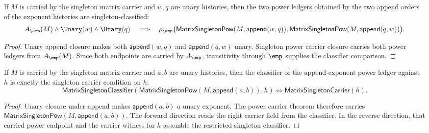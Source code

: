 \begin{theorem}
\label{thm:matrix-singleton-pow-append-exponent-comm-classifier}
If $M$ is carried by the singleton matrix carrier and $w,q$ are unary
histories, then the two power ledgers obtained by the two append orders of the
exponent histories are singleton-classified:
$$
A_{\emp}(M)\land\Unary(w)\land\Unary(q)
\quad\Longrightarrow\quad
\rho_{\emp}\bigl(\mathsf{MatrixSingletonPow}(M,\mathsf{append}(w,q)),
\mathsf{MatrixSingletonPow}(M,\mathsf{append}(q,w))\bigr).
$$
\end{theorem}
\begin{proof}
Unary append closure makes both $\mathsf{append}(w,q)$ and
$\mathsf{append}(q,w)$ unary. Singleton power carrier closure carries both
power ledgers from $A_{\emp}(M)$. Since both endpoints are carried by
$A_{\emp}$, transitivity through $\emp$ supplies the classifier comparison.
\end{proof}

\begin{theorem}
\label{thm:matrix-singleton-pow-append-exponent-classifier-iff}
If $M$ is carried by the singleton matrix carrier and $a,b$ are unary
histories, then the classifier of the append-exponent power ledger against
$h$ is exactly the singleton carrier condition on $h$:
$$
\mathsf{MatrixSingletonClassifier}
  (\mathsf{MatrixSingletonPow}(M,\mathsf{append}(a,b)),h)
\Longleftrightarrow
\mathsf{MatrixSingletonCarrier}(h).
$$
\end{theorem}
\begin{proof}
Unary closure under append makes $\mathsf{append}(a,b)$ a unary exponent. The
power carrier theorem therefore carries
$\mathsf{MatrixSingletonPow}(M,\mathsf{append}(a,b))$. The forward direction
reads the right carrier field from the classifier. In the reverse direction,
that carried power endpoint and the carrier witness for $h$ assemble the
restricted singleton classifier.
\end{proof}

